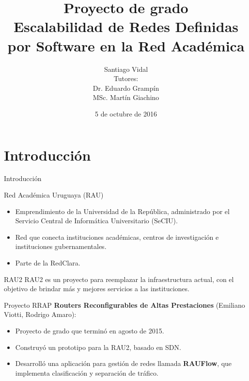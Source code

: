\documentclass[xcolor=svgnames]{beamer}
\title
	[Escalabilidad de SDN en la RAU]
  {Proyecto de grado \\
  	Escalabilidad de Redes Definidas por Software en la Red Académica}
\author
	[Santiago Vidal]
  {Santiago Vidal \\
  	\vspace{4mm}
  	{\normalfont\small Tutores: \\
  	Dr. Eduardo Grampín \\
  	MSc. Martín Giachino}}
\date
  {5 de octubre de 2016}
\institute
  [UdelaR]
  {Instituto de Computación \\
  	Facultad de Ingeniería \\
  	Universidad de la República}
\begin{document}
\graphicspath{{Figs/}}

\maketitle

\begin{frame}{}
	\tableofcontents
\end{frame}

\section{Introducción}

\begin{frame}
	\tableofcontents[currentsection]
\end{frame}

\begin{frame}{Introducción}
	\begin{block}{Red Académica Uruguaya (RAU)}
		\begin{itemize}
			\item Emprendimiento de la Universidad de la República, administrado por el Servicio Central de Informática Universitario
			(SeCIU).
			\item Red que conecta instituciones académicas, centros de investigación e instituciones gubernamentales.
			\item Parte de la RedClara.
		\end{itemize}
	\end{block}
	\begin{block}{RAU2}
		RAU2 es un proyecto para reemplazar la infraestructura actual, con el objetivo de brindar más y mejores servicios a las instituciones.
	\end{block}
\end{frame}

\begin{frame}{Proyecto RRAP}
	\textbf{Routers Reconfigurables de Altas Prestaciones} (Emiliano Viotti, Rodrigo Amaro):
	\begin{itemize}
		\item Proyecto de grado que terminó en agosto de 2015.
		\item Construyó un prototipo para la RAU2, basado en SDN.
		\item Desarrolló una aplicación para gestión de redes llamada \textbf{RAUFlow}, que implementa clasificación y separación de tráfico.
	\end{itemize}
\end{frame}
\end{document}
